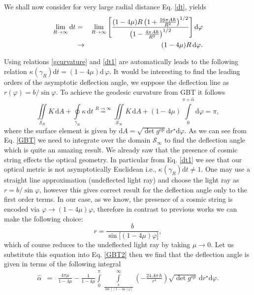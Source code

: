 \documentclass[preprint,superscriptaddress,amsfonts,amssymb,amsmath,showpacs]{revtex4}
\begin{document}
We shall now consider for very large radial distance Eq. \eqref{dt}, yields
\begin{eqnarray}\notag\label{dt1}
\lim_{R\rightarrow \infty } \mathrm{d}t &=&\lim_{R\rightarrow \infty
}\left[\frac{(1-4 \mu) R \left(1+\frac{16 \pi A \hbar}{R^2}\right)^{1/2}}{\left(1-\frac{4 \pi A \hbar }{R^2}\right)^{1/2}}\right] \mathrm{d}\varphi\\
&\to & (1-4 \mu) R \, \mathrm{d}\varphi.  
\end{eqnarray}%

Using relations \eqref{gcurvature} and \eqref{dt1} are automatically leads to the following relation $\kappa (\gamma_{R})\mathrm{d}t = (1-4\mu)\mathrm{d}\,\varphi$. It would be interesting to find the leading orders of the asymptotic deflection angle, we suppose the deflection line as $ r(\varphi) =b/ \sin\varphi$. To achieve the geodesic curvature from GBT it follows
\begin{equation}\label{GBT2}
\iint\limits_{\mathcal{S}_{R}}K\,\mathrm{d}A+\oint\limits_{\gamma_{R}}\kappa \,%
\mathrm{d}t\overset{{R\rightarrow \infty }}{=}\iint\limits_{\mathcal{S}%
_{\infty }}K\,\mathrm{d}A+ (1-4 \mu) \int\limits_{0}^{\pi + \hat{\alpha}}\mathrm{d}\varphi
=\pi,
\end{equation}
where the surface element is given by $\mathrm{d}A=\sqrt{\det g^{op}}\mathrm{d}r^{\star}\mathrm{d}\varphi.$ As we can see from Eq. \eqref{GBT} we need to integrate over the domain $\mathcal{S}_{\infty}$ to find the deflection angle which is quite an amazing result. We already saw that the presence of cosmic string effects the optical geometry. In particular from Eq. \eqref{dt1} we see that our optical metric is not asymptotically Euclidean i.e., $\kappa(\gamma_R) \mathrm{d}t \neq 1$.  One may use a straight line approximation (undeflected light ray) and choose  the light ray as $r=b/\sin\varphi$, however this gives correct result for the deflection angle only to the first order terms.  In our case, as we know, the presence of a cosmic string is encoded via $\varphi \to (1-4\mu ) \varphi$, therefore in contrast to previous works we can make the following choice:
\begin{equation}
r=\frac{b}{\sin\Big[(1-4\mu) \varphi\big]},
\end{equation} 
which of course reduces to the undeflected light ray by taking $\mu\to 0$. Let us substitute this equation into Eq. \eqref{GBT2} then we find that the deflection angle is given in terms of the following integral
\begin{eqnarray}
\hat{\alpha}&=&\frac{4 \pi \mu}{1-4 \mu}-\frac{1}{1-4 \mu}\int\limits_{0}^{\pi}\int\limits_{\frac{b}{\sin \left[(1-4\mu)\varphi \right]}}^{\infty}\left(  -{\frac {24\,A\pi\,\hbar }{{r}^{4}}} \right)\sqrt{\det g^{op}}\,\mathrm{d}r^{\star}\mathrm{d}\varphi.
\end{eqnarray}
\end{document}
